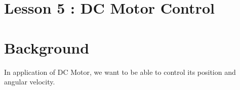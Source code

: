 \documentclass[12pt,a4paper]{article}
\begin{document}
	\section*{\centering Lesson 5 : DC Motor Control}
	\section{Background}
	In application of DC Motor, we want to be able to control its position and angular velocity.
	
\end{document}
